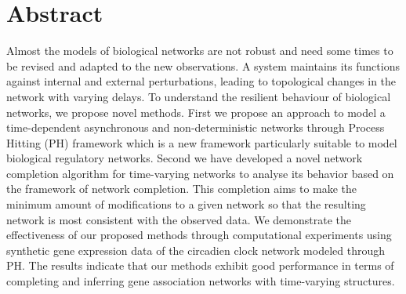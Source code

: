 \section*{Abstract}

Almost the models of biological networks are not robust and need some times to be revised and adapted to the new observations. A system maintains its functions against internal and external perturbations, leading to topological changes in the network with varying delays. To understand the resilient behaviour of biological networks, we propose novel methods. First we propose an approach to model a time-dependent asynchronous and non-deterministic networks through Process Hitting (PH) framework which is a new framework particularly suitable to model biological regulatory networks. Second we have developed a novel network completion algorithm for time-varying networks to analyse its behavior based on the framework of network completion. This completion aims to make the minimum amount of modifications to a given network so that the resulting network is most consistent with the observed data.
We demonstrate the effectiveness of our proposed methods through computational experiments using synthetic gene expression data of the circadien clock network modeled through PH.  The results indicate that our methods exhibit good performance in terms of completing and inferring gene association networks with time-varying structures.






